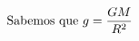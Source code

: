 \documentclass[preview]{standalone}
\begin{document}
\begin{align*}
\special{dvisvgm:raw <g id='unique000'>}\text{Sabemos que } g = \frac{GM}{R^2}\special{dvisvgm:raw </g>}
\end{align*}
\end{document}
